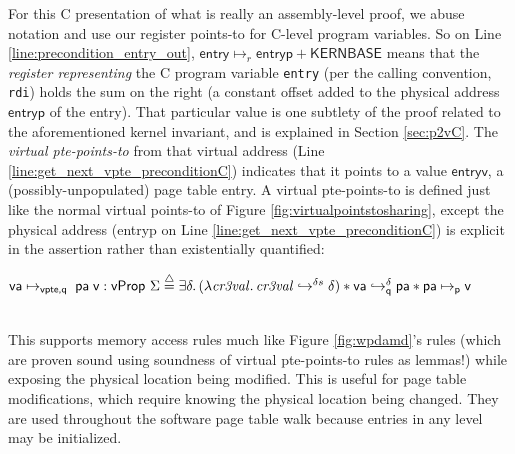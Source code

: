 For this C presentation of what is really an assembly-level proof, we abuse notation and
use our register points-to for C-level program variables. So on Line \ref{line:precondition_entry_out},
$\mathsf{entry} \mapsto_r \mathsf{entryp+KERNBASE}$ means that the \emph{register representing} the C program variable
\lstinline|entry| (per the calling convention, \lstinline|rdi|) holds the sum on the right (a constant offset added to the physical address $\mathsf{entryp}$ of the entry).
That particular value is one subtlety of the proof related to the aforementioned kernel invariant, and is explained in Section \ref{sec:p2vC}.
The \emph{virtual pte-points-to} from that virtual address (Line \ref{line:get_next_vpte_preconditionC}) indicates that it points to a value
$\mathsf{entryv}$, a (possibly-unpopulated) page table entry.
A virtual pte-points-to is defined just like the normal virtual points-to of Figure \ref{fig:virtualpointstosharing},
except the physical address (\textsf{entryp} on Line \ref{line:get_next_vpte_preconditionC}) is explicit in the assertion
rather than existentially quantified:\\
\centerline{$
    \vaddr\mapsto_{\textsf{vpte,q}} \; \paddr \; \vpage : \mathsf{vProp}~\Sigma \stackrel{\triangle}{=} 
    \exists \delta\ldotp
	(\lambda \mathit{cr3val}\ldotp
	\ghostmaptoken{\delta{}s}{\mathit{cr3val}}{\delta}) \ast 
  \fracghostmaptoken{\delta}{\vaddr}{\paddr}{\qfrac} \ast \paddr \mapsto_{\mathsf{p}} \vpage
$}\\
This supports memory access rules much like Figure \ref{fig:wpdamd}'s rules (which are proven sound using soundness of virtual pte-points-to rules as lemmas!)
while exposing the physical location being modified.
This is useful for page table modifications, which require knowing the physical location being changed.
They are used throughout the software page table walk because entries in any level may be initialized.

